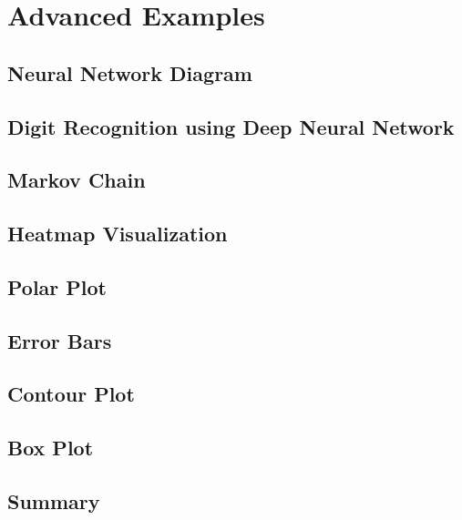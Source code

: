 \documentclass{beamer}
\begin{document}
\section{Advanced Examples}
\subsection{Neural Network Diagram}

\subsection{Digit Recognition using Deep Neural Network}

\subsection{Markov Chain}

\subsection{Heatmap Visualization}

\subsection{Polar Plot}

\subsection{Error Bars}

\subsection{Contour Plot}

\subsection{Box Plot}

\subsection{Summary}

\end{document}
